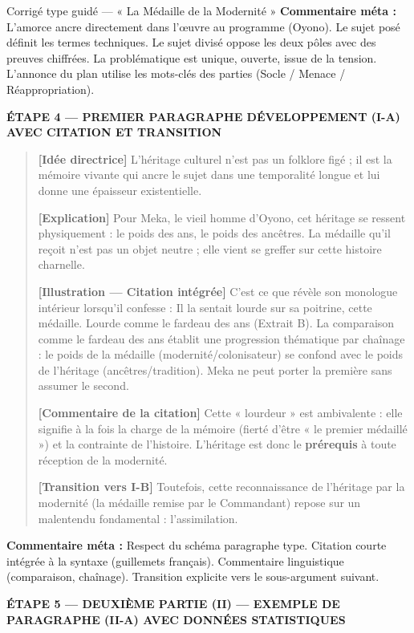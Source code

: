\documentclass[11pt]{article}
\newcommand{\cle}[1]{{\popxbold\color{popdark}#1}}
\begin{document}
\begin{exoresolu}{Corrigé type guidé — « La Médaille de la Modernité »}
\noindent \textbf{Commentaire méta :} L'amorce ancre directement dans l'œuvre au programme (Oyono). Le sujet posé définit les termes techniques. Le sujet divisé oppose les deux pôles avec des preuves chiffrées. La problématique est unique, ouverte, issue de la tension. L'annonce du plan utilise les mots-clés des parties (Socle / Menace / Réappropriation).

\textbf{ÉTAPE 4 — PREMIER PARAGRAPHE DÉVELOPPEMENT (I-A) AVEC CITATION ET TRANSITION}

\begin{quote}
    \textbf{[Idée directrice]} L'héritage culturel n'est pas un folklore figé ; il est la \cle{mémoire vivante} qui ancre le sujet dans une temporalité longue et lui donne une épaisseur existentielle.
    
    \textbf{[Explication]} Pour Meka, le vieil homme d'Oyono, cet héritage se ressent physiquement : le poids des ans, le poids des ancêtres. La médaille qu'il reçoit n'est pas un objet neutre ; elle vient se greffer sur cette histoire charnelle.
    
    \textbf{[Illustration — Citation intégrée]} C'est ce que révèle son monologue intérieur lorsqu'il confesse : \og Il la sentait lourde sur sa poitrine, cette médaille. Lourde comme le fardeau des ans \fg{} (Extrait B). La comparaison \og comme le fardeau des ans \fg{} établit une \cle{progression thématique par chaînage} : le poids de la médaille (modernité/colonisateur) se confond avec le poids de l'héritage (ancêtres/tradition). Meka ne peut porter la première sans assumer le second.
    
    \textbf{[Commentaire de la citation]} Cette « lourdeur » est ambivalente : elle signifie à la fois la charge de la mémoire (fierté d'être « le premier médaillé ») et la contrainte de l'histoire. L'héritage est donc le \textbf{prérequis} à toute réception de la modernité.
    
    \textbf{[Transition vers I-B]} Toutefois, cette reconnaissance de l'héritage par la modernité (la médaille remise par le Commandant) repose sur un malentendu fondamental : l'assimilation.
\end{quote}

\noindent \textbf{Commentaire méta :} Respect du schéma paragraphe type. Citation courte intégrée à la syntaxe (guillemets français). Commentaire linguistique (comparaison, chaînage). Transition explicite vers le sous-argument suivant.

\textbf{ÉTAPE 5 — DEUXIÈME PARTIE (II) — EXEMPLE DE PARAGRAPHE (II-A) AVEC DONNÉES STATISTIQUES}


\end{exoresolu}
\end{document}
